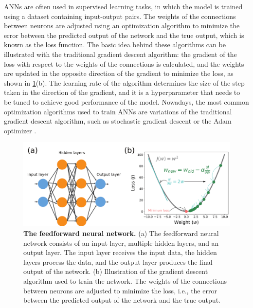 ANNs are often used in supervised learning tasks, in which the model is
trained
using a dataset containing input-output pairs. The weights of the connections
between neurons are adjusted using an optimization algorithm to minimize the
error between the predicted output of the network and the true output, which
is
known as the loss function. The basic idea behind these algorithms can be
illustrated with the traditional gradient descent algorithm: the gradient of
the loss with respect to the weights of the connections is calculated, and
the
weights are updated in the opposite direction of the gradient to minimize the
loss, as shown in \cref{fig:ANN}(b). The learning rate of the algorithm
determines the size of the step taken in the direction of the gradient, and
it
is a hyperparameter that needs to be tuned to achieve good performance of the
model. Nowadays, the most common optimization algorithms used to train ANNs
are
variations of the traditional gradient descent algorithm, such as stochastic
gradient descent or the Adam optimizer \cite{Goodfellow2016}.

\begin{figure}[H]
  \centering
  \includegraphics[width=1\textwidth]{Figures/ANN.pdf}
  \caption[The feedforward neural network]{
    \textbf{The feedforward neural network.} (a) The feedforward neural
    network
    consists of an input layer, multiple hidden layers, and an output layer.
    The input layer receives the input data, the hidden layers process the
    data, and the output layer produces the final output of the network.
    (b) Illustration of the gradient descent algorithm used to train the
    network. The weights of the connections between neurons are adjusted to
    minimize the loss, i.e., the error between the predicted output of the
    network and the true output.}
  \label{fig:ANN}
\end{figure}

